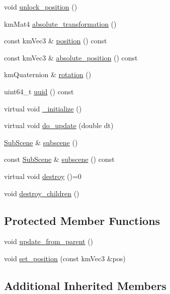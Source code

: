 \begin{DoxyCompactItemize}
\item 
void \hyperlink{classkglt_1_1_object_a6ab353f2a67a6fa1c315806d3a3db8eb}{unlock\-\_\-position} ()
\item 
km\-Mat4 \hyperlink{classkglt_1_1_object_ae3138a9615dfa006ec8190458bff2464}{absolute\-\_\-transformation} ()
\item 
const km\-Vec3 \& \hyperlink{classkglt_1_1_object_ab103a09c02763d7fc519629292d95200}{position} () const 
\item 
const km\-Vec3 \& \hyperlink{classkglt_1_1_object_ae90e0529c4575f3ffbbc9389f36c99d0}{absolute\-\_\-position} () const 
\item 
km\-Quaternion \& \hyperlink{classkglt_1_1_object_a31685ddd16a510828e0ca9829d2b2a76}{rotation} ()
\item 
uint64\-\_\-t \hyperlink{classkglt_1_1_object_ac669de8e86d5d5aa64ac900517d9f61c}{uuid} () const 
\item 
virtual void \hyperlink{classkglt_1_1_object_af58947a939de0c9d277238e38900697e}{\-\_\-initialize} ()
\item 
virtual void \hyperlink{classkglt_1_1_object_a1e18ece13b9fee40beb2fd04c6c5492e}{do\-\_\-update} (double dt)
\item 
\hyperlink{classkglt_1_1_sub_scene}{Sub\-Scene} \& \hyperlink{classkglt_1_1_object_a857d97844a3a56aeb8f0a180b7cf592f}{subscene} ()
\item 
const \hyperlink{classkglt_1_1_sub_scene}{Sub\-Scene} \& \hyperlink{classkglt_1_1_object_adcb2e14489a63d2ee222405a966664e4}{subscene} () const 
\item 
virtual void \hyperlink{classkglt_1_1_object_afad686b2f2f37613fc5eb3ea3f93e445}{destroy} ()=0
\item 
void \hyperlink{classkglt_1_1_object_a76e642137af8790a01d0bafe2da0f15b}{destroy\-\_\-children} ()
\end{DoxyCompactItemize}
\subsection*{Protected Member Functions}
\begin{DoxyCompactItemize}
\item 
void \hyperlink{classkglt_1_1_object_a7d02213b1a63f44c1e2348821753d5e1}{update\-\_\-from\-\_\-parent} ()
\item 
void \hyperlink{classkglt_1_1_object_a8712682820d9cfab40405ed63a932820}{set\-\_\-position} (const km\-Vec3 \&pos)
\end{DoxyCompactItemize}
\subsection*{Additional Inherited Members}


